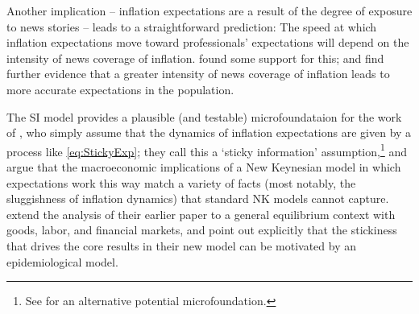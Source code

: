 Another implication -- inflation expectations are a result of the degree of exposure to news stories -- leads to a straightforward prediction:  The speed at which inflation expectations move toward professionals' expectations will depend on the intensity of news coverage of inflation.  \cite{carroll2003macroeconomic} found some support for this; \cite{lamla2014role} and \cite{larsen2021news} find further evidence that a greater intensity of news coverage of inflation leads to more accurate expectations in the population.  %




The SI model provides a plausible (and testable) microfoundataion for the work of \cite{mr2002Sticky}, who simply assume that the dynamics of inflation expectations are given by a process like \eqref{eq:StickyExp}; they call this a `sticky information' assumption,\footnote{See \bvbayesianlearningFull for an alternative potential microfoundation.} and argue that the macroeconomic implications of a New Keynesian model in which expectations work this way match a variety of facts (most notably, the sluggishness of inflation dynamics) that standard NK models cannot capture.  \cite{mankiw2007sticky} extend the analysis of their earlier paper to a general equilibrium context with goods, labor, and financial markets, and point out explicitly that the stickiness that drives the core results in their new model can be motivated by an epidemiological model.


